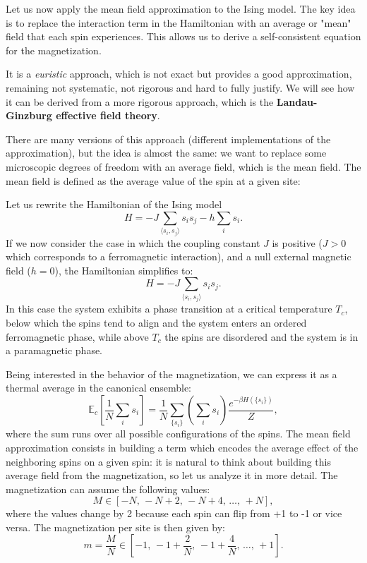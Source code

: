 Let us now apply the mean field approximation to the Ising model. The key idea is to replace the interaction term in the Hamiltonian with an average or "mean" field that each spin experiences. This allows us to derive a self-consistent equation for the magnetization.

It is a \textit{euristic} approach, which is not exact but provides a good approximation, remaining not systematic, not rigorous and hard to fully justify. We will see how it can be derived from a more rigorous approach, which is the \textbf{Landau-Ginzburg effective field theory}.

There are many versions of this approach (different implementations of the approximation), but the idea is almost the same: we want to replace some microscopic degrees of freedom with an average field, which is the mean field. The mean field is defined as the average value of the spin at a given site:

Let us rewrite the Hamiltonian of the Ising model
\[
    H = - J \sum_{\langle s_i, s_j \rangle} s_i s_j - h \sum_i s_i.
\]
If we now consider the case in which the coupling constant \(J\) is positive (\(J>0\) which corresponds to a ferromagnetic interaction), and a null external magnetic field (\(h=0\)), the Hamiltonian simplifies to:
\[
    H = - J \sum_{\langle s_i, s_j \rangle} s_i s_j.
\]
In this case the system exhibits a phase transition at a critical temperature \(T_c\), below which the spins tend to align and the system enters an ordered ferromagnetic phase, while above \(T_c\) the spins are disordered and the system is in a paramagnetic phase.

Being interested in the behavior of the magnetization, we can express it as a thermal average in the canonical ensemble:
\[
    \mathbb{E}_c \left[ \frac{1}{N} \sum_{i} s_i \right] = \frac{1}{N} \sum_{\{s_i\}} \left( \sum_{i} s_i \right) \frac{e^{-\beta H(\{s_i\})}}{Z},
\]
where the sum runs over all possible configurations of the spins. The mean field approximation consists in building a term which encodes the average effect of the neighboring spins on a given spin: it is natural to think about building this average field from the magnetization, so let us analyze it in more detail. The magnetization can assume the following values:
\[
    M \in \left[ -N,\, -N+2,\, -N+4,\, \ldots,\, +N \right],
\]
where the values change by 2 because each spin can flip from +1 to -1 or vice versa. The magnetization per site is then given by:
\[
    m = \frac{M}{N} \in \left[ -1,\, -1 + \frac{2}{N},\, -1 + \frac{4}{N},\, \ldots,\, +1 \right].
\]

